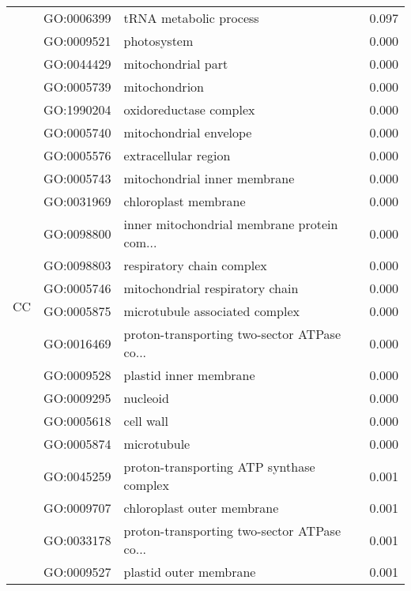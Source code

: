 \begin{longtable}{lllr}
   & GO:0006399 &                       tRNA metabolic process &         0.097 \\
\cline{1-4}
\multirow{38}{*}{CC} & GO:0009521 &                                  photosystem &         0.000 \\
   & GO:0044429 &                           mitochondrial part &         0.000 \\
   & GO:0005739 &                                mitochondrion &         0.000 \\
   & GO:1990204 &                       oxidoreductase complex &         0.000 \\
   & GO:0005740 &                       mitochondrial envelope &         0.000 \\
   & GO:0005576 &                         extracellular region &         0.000 \\
   & GO:0005743 &                 mitochondrial inner membrane &         0.000 \\
   & GO:0031969 &                         chloroplast membrane &         0.000 \\
   & GO:0098800 &  inner mitochondrial membrane protein com... &         0.000 \\
   & GO:0098803 &                    respiratory chain complex &         0.000 \\
   & GO:0005746 &              mitochondrial respiratory chain &         0.000 \\
   & GO:0005875 &               microtubule associated complex &         0.000 \\
   & GO:0016469 &  proton-transporting two-sector ATPase co... &         0.000 \\
   & GO:0009528 &                       plastid inner membrane &         0.000 \\
   & GO:0009295 &                                     nucleoid &         0.000 \\
   & GO:0005618 &                                    cell wall &         0.000 \\
   & GO:0005874 &                                  microtubule &         0.000 \\
   & GO:0045259 &     proton-transporting ATP synthase complex &         0.001 \\
   & GO:0009707 &                   chloroplast outer membrane &         0.001 \\
   & GO:0033178 &  proton-transporting two-sector ATPase co... &         0.001 \\
   & GO:0009527 &                       plastid outer membrane &         0.001 \\

\end{longtable}
